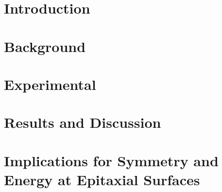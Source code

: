 \section{Introduction}

\section{Background}

\section{Experimental}

\section{Results and Discussion}

\section{Implications for Symmetry and Energy at Epitaxial Surfaces}